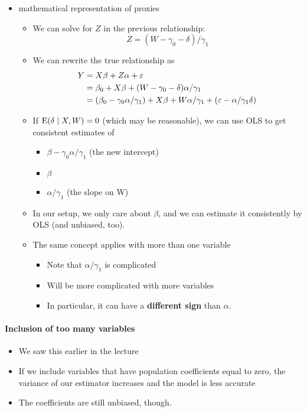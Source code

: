\begin{itemize}

\item mathematical representation of proxies
\begin{itemize}
\item We can solve for $Z$ in the previous relationship:
  \[ Z = (W - \gamma_0 - \delta ) / \gamma_1 \]
\item We can rewrite the true relationship as
  \begin{align*} 
    Y &= X\beta + Z\alpha + \varepsilon \\
    &= \beta_0 + X\beta + (W - \gamma_0 - \delta) \alpha/\gamma_1 \\
    &= (\beta_0 - \gamma_0\alpha/\gamma_1) + X\beta + W \alpha/\gamma_1 + (\varepsilon - \alpha/\gamma_1\delta)
  \end{align*}
\item If $\operatorname{E}(\delta \mid X, W) = 0$ (which may be reasonable), we
           can use OLS to get consistent estimates of
\begin{itemize}
\item $\beta-\gamma_0\alpha/\gamma_1$ (the new intercept)
\item $\beta$
\item $\alpha/\gamma_1$ (the slope on W)
\end{itemize}
\item In our setup, we only care about $\beta$, and we can
           estimate it consistently by OLS (and unbiased, too).
\item The same concept applies with more than one variable
\begin{itemize}
\item Note that $\alpha/\gamma_1$ is complicated
\item Will be more complicated with more variables
\item In particular, it can have a \textbf{different sign} than $\alpha$.
\end{itemize}
\end{itemize}
\end{itemize}

\paragraph{Inclusion of too many variables}
\begin{itemize}
\item We saw this earlier in the lecture
\item If we include variables that have population coefficients equal
        to zero, the variance of our estimator increases and the model
        is less accurate
\item The coefficients are still unbiased, though.
\end{itemize}

